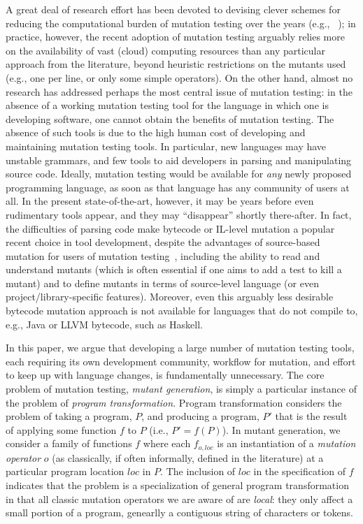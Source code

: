 \documentclass[acmsmall,screen,review,anonymous]{acmart}
\begin{document}
A great deal of research effort has been devoted to devising clever
schemes for reducing the computational burden of mutation testing over
the years (e.g., ~\cite{offutt2001mutation,
  untch1993mutation,KaufmanFAKAJ2022}); in practice, however, the recent adoption of mutation
testing arguably relies more on the availability of vast (cloud) computing
resources than any particular approach from the literature, beyond
heuristic restrictions on the mutants used (e.g., one per line, or
only some simple operators).   On the other hand, almost no
research has addressed perhaps the most central issue of
mutation testing: in the absence of a working mutation testing
tool for the language in which one is developing software, one cannot
obtain the benefits of mutation testing.  The absence of such tools is
due to the high human cost of developing and maintaining mutation
testing tools.  In particular, new languages may have unstable
grammars, and few tools to aid developers in parsing and manipulating
source code.   Ideally, mutation testing would be available for
\emph{any} newly proposed programming language, as soon as that
language has any community of users at all.  In the present
state-of-the-art, however, it may be years before even rudimentary
tools appear, and they may ``disappear'' shortly there-after.  In
fact, the difficulties of parsing code make bytecode or IL-level
mutation a popular recent choice in tool development, despite the advantages of source-based mutation for
users of mutation testing~\cite{CompareSrcBinary}, including the
ability to read and understand mutants (which is often essential if
one aims to add a test to kill a mutant) and to define mutants in
terms of source-level language (or even project/library-specific
features).  Moreover, even this arguably less desirable bytecode mutation
approach is not available for languages that do not compile to, e.g.,
Java or LLVM bytecode, such as Haskell.

In this paper, we argue that developing a large number of mutation
testing tools, each requiring its own development community, workflow
for mutation, and effort to keep up with language changes, is fundamentally
unnecessary.  The core problem of mutation testing,
\emph{mutant generation}, is simply a particular instance of the
problem of \emph{program transformation}.  Program transformation
considers the problem of taking a program, $P$, and producing a
program, $P'$ that is the result of applying some function $f$ to $P$
(i.e., $P' = f(P)$).  In mutant generation, we
consider a family of functions $f$ where each $f_{o,loc}$ is an
instantiation of a \emph{mutation operator} $o$  (as classically, if
often informally, defined in the literature) at a particular program
location $loc$ in $P$.  The inclusion of $loc$ in the specification of
$f$ indicates that the problem is a specialization of general
program transformation in that all classic mutation operators we are
aware of are \emph{local}: they only affect a small portion of a
program, genearlly a contiguous string of characters or tokens.
\end{document}
